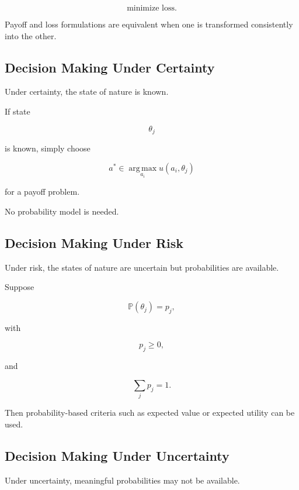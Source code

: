 \[
\boxed{
\text{minimize loss}.
}
\]

Payoff and loss formulations are equivalent when one is transformed
consistently into the other.

\subsection{Decision Making Under Certainty}
\label{subsec:decision-under-certainty}

Under certainty, the state of nature is known.

If state

\[
\theta_j
\]

is known, simply choose

\[
\boxed{
a^*
\in
\operatorname*{arg\,max}_{a_i}
u(a_i,\theta_j)
}
\]

for a payoff problem.

No probability model is needed.

\subsection{Decision Making Under Risk}
\label{subsec:decision-under-risk}

Under risk, the states of nature are uncertain but probabilities are
available.

Suppose

\[
\boxed{
\mathbb{P}(\theta_j)
=
p_j,
}
\]

with

\[
p_j\geq0,
\]

and

\[
\sum_jp_j=1.
\]

Then probability-based criteria such as expected value or expected utility
can be used.

\subsection{Decision Making Under Uncertainty}
\label{subsec:decision-under-uncertainty}

Under uncertainty, meaningful probabilities may not be available.

